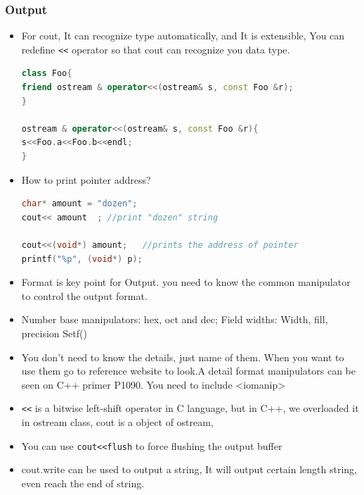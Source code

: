 \documentclass[a4paper,12pt,twoside]{book}
\begin{document}
\subsubsection{Output}
\begin{itemize}
\item For cout, It can recognize type automatically, and It is extensible, You can redefine \verb=<<= operator so that cout can recognize you data type.
\begin{lstlisting}[frame=single, language=c++]
class Foo{
friend ostream & operator<<(ostream& s, const Foo &r);
}

ostream & operator<<(ostream& s, const Foo &r){
s<<Foo.a<<Foo.b<<endl;
}
\end{lstlisting}

\item  How to print pointer address?
\begin{lstlisting}[frame=single, language=c++]
char* amount = "dozen";
cout<< amount  ; //print "dozen" string

cout<<(void*) amount;   //prints the address of pointer
printf("%p", (void*) p);
\end{lstlisting}


\item Format is key point for Output. you need to know the common manipulator to control the output format.
\item Number base manipulators:  hex, oct  and dec; Field widths: Width,  fill, precision Setf()
\item You don't need to know the details, just name of them. When you want to use them go to reference website to look.A detail format manipulators can be seen on C++ primer P1090. You need to include <iomanip>

\item \verb=<<= is a bitwise left-shift operator in C language, but in C++, we overloaded it in ostream class, cout is a object of ostream,

\item You can use \verb=cout<<flush= to force flushing the output buffer
\item cout.write can be used to output a string, It will output certain length string, even reach the end of string.


\end{itemize}
\end{document}
